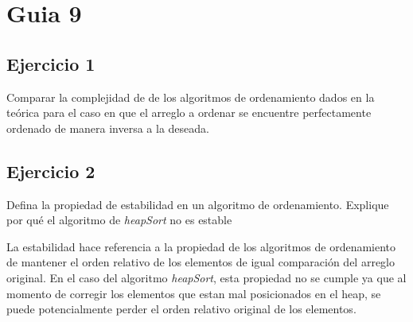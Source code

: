 





\maketitle
\newpage

\tableofcontents
\newpage

\section{Guia 9}

\subsection{Ejercicio 1}
Comparar la complejidad de de los algoritmos de ordenamiento dados en la teórica para el caso en que el arreglo a ordenar se encuentre perfectamente ordenado de manera inversa a la deseada.

\hacer

\subsection{Ejercicio 2}
Defina la propiedad de estabilidad en un algoritmo de ordenamiento. Explique por qué el algoritmo de \textit{heapSort} no es estable

La estabilidad hace referencia a la propiedad de los algoritmos de ordenamiento de mantener el orden relativo de los elementos de igual comparación del arreglo original. En el caso del algoritmo \textit{heapSort}, esta propiedad no se cumple ya que al momento de corregir los elementos que estan mal posicionados en el heap, se puede potencialmente perder el orden relativo original de los elementos.

